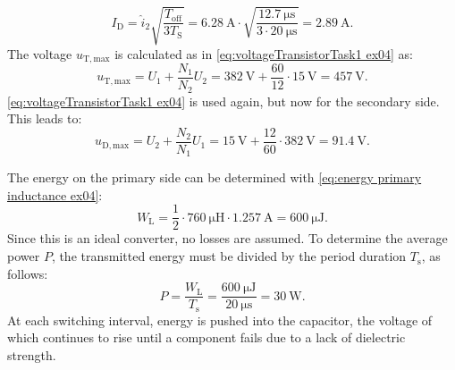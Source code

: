 \begin{solutionblock}
    \begin{equation}
        I_\mathrm{D} = \hat i_\mathrm{2} \sqrt{\frac{T_\mathrm{off}}{3T_\mathrm{S}}}= \SI{6.28}{\ampere}\cdot\sqrt{\frac{\SI{12.7}{\micro\s}}{3\cdot\SI{20}{\micro\s}}}= \SI{2.89}{\ampere}.
    \end{equation}
    The voltage  $u_\mathrm{T,max}$ is calculated as in \eqref{eq:voltageTransistorTask1 ex04} as:
    \begin{equation}
        u_\mathrm{T,max} = U_\mathrm{1} + \frac{N_\mathrm{1}}{N_\mathrm{2}}U_\mathrm{2}= \SI{382}{\volt}+\frac{60}{12}\cdot\SI{15}{\volt}= \SI{457}{\volt}.
    \end{equation}
    \eqref{eq:voltageTransistorTask1 ex04} is used again, but now for the secondary side. This leads to:
    \begin{equation}
        u_\mathrm{D,max} = U_\mathrm{2} + \frac{N_\mathrm{2}}{N_\mathrm{1}}U_\mathrm{1}= \SI{15}{\volt}+\frac{12}{60}\cdot\SI{382}{\volt}= \SI{91.4}{\volt}.
    \end{equation}

\end{solutionblock}


\begin{solutionblock}
    The energy on the primary side can be determined with \eqref{eq:energy primary inductance ex04}:
    \begin{equation}
        W_\mathrm{L} = \frac{1}{2}\cdot \SI{760}{\micro\henry} \cdot \SI{1.257}{\ampere} = \SI{600}{\micro\joule}.
    \end{equation}
    Since this is an ideal converter, no losses are assumed. 
    To determine the average power ${P}$, the transmitted energy must be divided by the period duration $T_\mathrm{s}$, as follows:
    \begin{equation}
        {P} = \frac{W_\mathrm{L}}{T_\mathrm{s}} = \frac{\SI{600}{\micro\joule}}{\SI{20}{\micro\s}}=\SI{30}{\watt}.
    \end{equation}
At each switching interval, energy is pushed into the capacitor, the voltage of which continues to rise until a component fails due to a lack of dielectric strength.    
\end{solutionblock}

